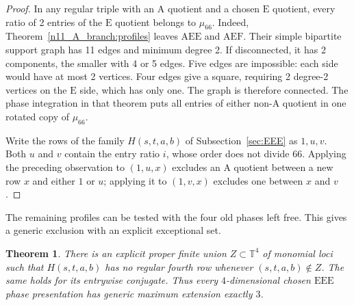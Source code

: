 \documentclass[11pt,a4paper]{article}
\newtheorem{theorem}{Theorem}[section]
\theoremstyle{plain}
\theoremstyle{definition}
\theoremstyle{plain}
\begin{document}
\begin{proof}
In any regular triple with an $\mathrm{A}$ quotient and a chosen $\mathrm{E}$ quotient, every ratio of 2 entries of the $\mathrm{E}$ quotient belongs to $\mu_{66}$. Indeed, Theorem~\ref{n11_A_branch:profiles} leaves $\mathrm{AEE}$ and $\mathrm{AEF}$. Their simple bipartite support graph has 11 edges and minimum degree 2. If disconnected, it has 2 components, the smaller with 4 or 5 edges. Five edges are impossible: each side would have at most 2 vertices. Four edges give a square, requiring 2 degree-2 vertices on the $\mathrm{E}$ side, which has only one. The graph is therefore connected. The phase integration in that theorem puts all entries of either non-$\mathrm{A}$ quotient in one rotated copy of $\mu_{66}$.

Write the rows of the family $H(s,t,a,b)$ of Subsection~\ref{sec:EEE} as $1,u,v$. Both $u$ and $v$ contain the entry ratio $i$, whose order does not divide 66. Applying the preceding observation to $(1,u,x)$ excludes an $\mathrm{A}$ quotient between a new row $x$ and either $1$ or $u$; applying it to $(1,v,x)$ excludes one between $x$ and $v$.
\end{proof}

The remaining profiles can be tested with the four old phases left free. This gives a generic exclusion with an explicit exceptional set.

\par\addvspace{\medskipamount}\noindent
\begin{minipage}{\linewidth}
\begin{theorem}\label{eee_generic:extension}
There is an explicit proper finite union $Z\subset\mathbb T^4$ of monomial loci such that $H(s,t,a,b)$ has no regular fourth row whenever $(s,t,a,b)\notin Z$. The same holds for its entrywise conjugate. Thus every $4$-dimensional chosen $\mathrm{EEE}$ phase presentation has generic maximum extension exactly $3$.
\end{theorem}
\end{minipage}
\par\addvspace{\medskipamount}
\end{document}

